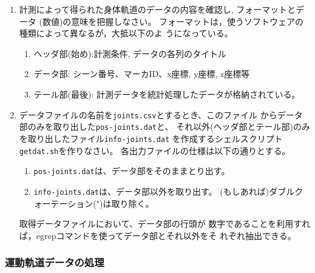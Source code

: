 \documentclass{jarticle}
\begin{document}
\begin{enumerate}
\item 計測によって得られた身体軌道のデータの内容を確認し, フォーマットとデータ
  (数値)の意味を把握しなさい。
  フォーマットは，使うソフトウェアの種類によって異なるが，大抵以下のよ
  うになっている。
  \begin{enumerate}
  \item ヘッダ部(始め):計測条件, データの各列のタイトル
  \item データ部: シーン番号、マーカID、x座標, y座標, z座標等
  \item テール部(最後): 計測データを統計処理したデータが格納されている。
  \end{enumerate}
\item データファイルの名前を\verb|joints.csv|とするとき、このファイル
  からデータ部のみを取り出した\verb|pos-joints.dat|と、
  それ以外(ヘッダ部とテール部)のみを取り出したファイル\verb|info-joints.dat|
  を作成するシェルスクリプト\verb|getdat.sh|を作りなさい。
  各出力ファイルの仕様は以下の通りとする。
  \begin{enumerate}
  \item \verb|pos-joints.dat|は、データ部をそのままとり出す。
  \item \verb|info-joints.dat|は、データ部以外を取り出す。
    (もしあれば)ダブルクォーテーション(")は取り除く。
  \end{enumerate}
  取得データファイルにおいて、データ部の行頭が
  数字であることを利用すれば，egrepコマンドを使ってデータ部とそれ以外をそ
  れぞれ抽出できる。
\end{enumerate}


\subsubsection{運動軌道データの処理}
\end{document}
